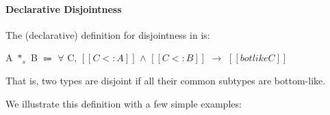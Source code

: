 \begin{comment}
\begin{proof}
  By induction on type $[[A]]$.
  \begin{itemize}
    \item Cases $[[Top]]$, $[[Bot]]$, $[[Int]]$ and $[[A -> B]]$ are trivial to prove.
    \item Case $[[A \/ B]]$ requires \Cref{lemma:union:sub-or}.
  \end{itemize}
\end{proof}
\end{comment}

\paragraph{Declarative Disjointness}
The (declarative) definition for disjointness in \name is:

\begin{definition}
  A $*_s$ B $\Coloneqq$ $\forall$ C, $[[C <: A]]$ $\wedge$ $[[C <: B]]$ $\rightarrow$ $[[botlike C]]$
\label{def:union:disj}
\end{definition}

\noindent That is, two types are disjoint if all their common subtypes are bottom-like.
\begin{comment}
With this definition we have that different primitive types are disjoint. For example
$[[Int]] * [[Bool]]$ since the only common subtypes of $[[Int]]$ and $[[Bool]]$
are bottom-like. A more interesting case is the disjointness of two function types.
It turns out that function types are never disjoint, since we can always find
a common subtype for any two function types. For example, if we have $[[Int -> Bool]]$
and $[[String -> Char]]$ then a common subtype that is not bottom-like is
$[[Top -> Bot]]$. Therefore, $[[Int -> Bool]]$ and $[[String -> Char]]$ are not
disjoint.

\noindent Reader may think at this point that $[[Bot]]$ type can simply be used in \Cref{def:union:disj}
instead of $[[botlike C]]$ in the conclusion. Answer to this question is
union type with $[[Bot]]$ as all primitive types is also a least subtype in \cal.
$[[botlike C]]$ also handles this case.
\end{comment}
We illustrate this definition with a few simple examples:

